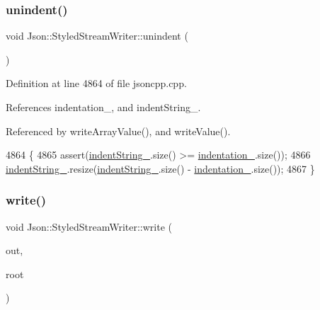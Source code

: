 \subsubsection{\texorpdfstring{unindent()}{unindent()}}
{\footnotesize\ttfamily void Json\+::\+Styled\+Stream\+Writer\+::unindent (\begin{DoxyParamCaption}{ }\end{DoxyParamCaption})\hspace{0.3cm}{\ttfamily [private]}}



Definition at line 4864 of file jsoncpp.\+cpp.



References indentation\+\_\+, and indent\+String\+\_\+.



Referenced by write\+Array\+Value(), and write\+Value().


\begin{DoxyCode}
4864                                   \{
4865   assert(\hyperlink{class_json_1_1_styled_stream_writer_a1481433ebe1491ea83b0beb92aed56c2}{indentString\_}.size() >= \hyperlink{class_json_1_1_styled_stream_writer_aa45d8fb4ca82d0550be9042012303713}{indentation\_}.size());
4866   \hyperlink{class_json_1_1_styled_stream_writer_a1481433ebe1491ea83b0beb92aed56c2}{indentString\_}.resize(\hyperlink{class_json_1_1_styled_stream_writer_a1481433ebe1491ea83b0beb92aed56c2}{indentString\_}.size() - 
      \hyperlink{class_json_1_1_styled_stream_writer_aa45d8fb4ca82d0550be9042012303713}{indentation\_}.size());
4867 \}
\end{DoxyCode}
\mbox{\label{class_json_1_1_styled_stream_writer_a5d89d984fe675641e42c4370cd247774}} 
\subsubsection{\texorpdfstring{write()}{write()}}
{\footnotesize\ttfamily void Json\+::\+Styled\+Stream\+Writer\+::write (\begin{DoxyParamCaption}\item[{\hyperlink{json_8h_a37a25be5fca174927780caeb280094ce}{J\+S\+O\+N\+C\+P\+P\+\_\+\+O\+S\+T\+R\+E\+AM} \&}]{out,  }\item[{const \hyperlink{class_json_1_1_value}{Value} \&}]{root }\end{DoxyParamCaption})}



